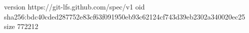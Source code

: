 version https://git-lfs.github.com/spec/v1
oid sha256:bdc40cded287752e83cf63f091950eb93c62124cf743d39eb2302a340020ec25
size 772212
